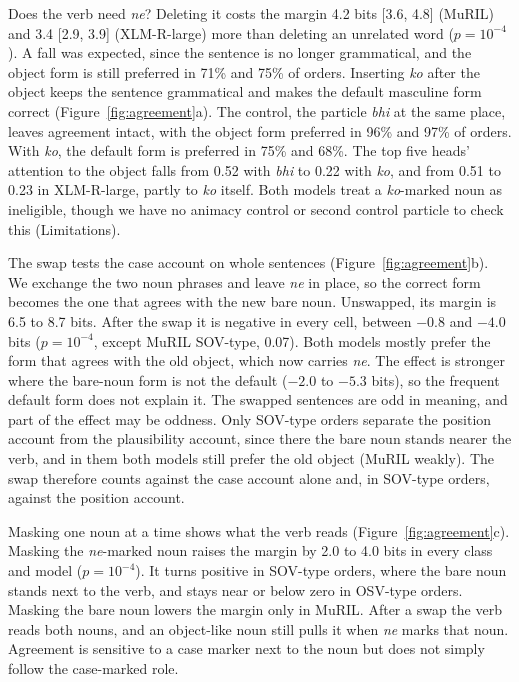 \documentclass[11pt]{article}
\begin{document}
Does the verb need \emph{ne}?
Deleting it costs the margin 4.2 bits [3.6, 4.8] (MuRIL) and 3.4 [2.9, 3.9] (XLM-R-large) more than deleting an unrelated word ($p=10^{-4}$).
A fall was expected, since the sentence is no longer grammatical, and the object form is still preferred in 71\% and 75\% of orders.
Inserting \emph{ko} after the object keeps the sentence grammatical and makes the default masculine form correct (Figure~\ref{fig:agreement}a).
The control, the particle \emph{bhi} at the same place, leaves agreement intact, with the object form preferred in 96\% and 97\% of orders.
With \emph{ko}, the default form is preferred in 75\% and 68\%.
The top five heads' attention to the object falls from 0.52 with \emph{bhi} to 0.22 with \emph{ko}, and from 0.51 to 0.23 in XLM-R-large, partly to \emph{ko} itself.
Both models treat a \emph{ko}-marked noun as ineligible, though we have no animacy control or second control particle to check this (Limitations).

The swap tests the case account on whole sentences (Figure~\ref{fig:agreement}b).
We exchange the two noun phrases and leave \emph{ne} in place, so the correct form becomes the one that agrees with the new bare noun.
Unswapped, its margin is 6.5 to 8.7 bits.
After the swap it is negative in every cell, between $-0.8$ and $-4.0$ bits ($p=10^{-4}$, except MuRIL SOV-type, 0.07).
Both models mostly prefer the form that agrees with the old object, which now carries \emph{ne}.
The effect is stronger where the bare-noun form is not the default ($-2.0$ to $-5.3$ bits), so the frequent default form does not explain it.
The swapped sentences are odd in meaning, and part of the effect may be oddness.
Only SOV-type orders separate the position account from the plausibility account, since there the bare noun stands nearer the verb, and in them both models still prefer the old object (MuRIL weakly).
The swap therefore counts against the case account alone and, in SOV-type orders, against the position account.

Masking one noun at a time shows what the verb reads (Figure~\ref{fig:agreement}c).
Masking the \emph{ne}-marked noun raises the margin by 2.0 to 4.0 bits in every class and model ($p=10^{-4}$).
It turns positive in SOV-type orders, where the bare noun stands next to the verb, and stays near or below zero in OSV-type orders.
Masking the bare noun lowers the margin only in MuRIL.
After a swap the verb reads both nouns, and an object-like noun still pulls it when \emph{ne} marks that noun.
Agreement is sensitive to a case marker next to the noun but does not simply follow the case-marked role.
\end{document}
